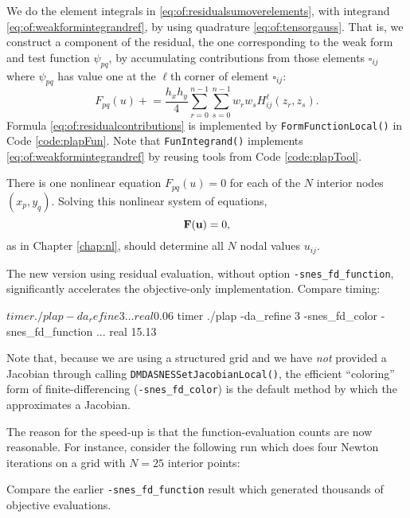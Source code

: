 We do the element integrals in \eqref{eq:of:residualsumoverelements}, with integrand \eqref{eq:of:weakformintegrandref}, by using quadrature \eqref{eq:of:tensorgauss}.  That is, we construct a component of the residual, the one corresponding to the weak form and test function $\psi_{pq}$, by accumulating contributions from those elements $\square_{ij}$ where $\psi_{pq}$ has value one at the $\ell$th corner of element $\square_{ij}$:
\begin{equation}
F_{pq}(u) \mathrel{+}= \frac{h_x h_y}{4} \sum_{r=0}^{n-1} \sum_{s=0}^{n-1} w_r w_s H_{ij}^\ell(z_r,z_s).  \label{eq:of:residualcontributions}
\end{equation}
Formula \eqref{eq:of:residualcontributions} is implemented by \texttt{FormFunctionLocal()} in Code \ref{code:plapFun}.  Note that \texttt{FunIntegrand()} implements \eqref{eq:of:weakformintegrandref} by reusing tools from Code \ref{code:plapTool}.

There is one nonlinear equation $F_{pq}(u)=0$ for each of the $N$ interior nodes $(x_p,y_q)$.  Solving this nonlinear system of equations,
    $$\mathbf{F}(\mathbf{u})=0,$$
as in Chapter \ref{chap:nl}, should determine all $N$ nodal values $u_{ij}$.

The new version using residual evaluation, without option \texttt{-snes\_fd\_function}, significantly accelerates the objective-only implementation.  Compare timing:
\begin{cline}
$ timer ./plap -da_refine 3
...
real 0.06
$ timer ./plap -da_refine 3 -snes_fd_color -snes_fd_function
...
real 15.13
\end{cline}
Note that, because we are using a \pDMDA structured grid and we have \emph{not} provided a Jacobian through calling \texttt{DMDASNESSetJacobianLocal()}, the efficient ``coloring'' form of finite-differencing (\texttt{-snes\_fd\_color}) is the default method by which the \pSNES approximates a Jacobian.

The reason for the speed-up is that the function-evaluation counts are now reasonable.  For instance, consider the following run which does four Newton iterations on a grid with $N=25$ interior points:
Compare the earlier \texttt{-snes\_fd\_function} result which generated thousands of objective evaluations.


